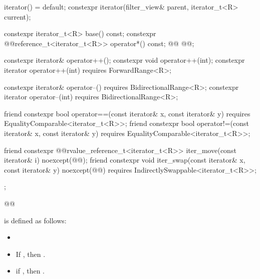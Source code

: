{\begin{codeblock}
{{    iterator() = default;
    constexpr iterator(filter_view& parent, iterator_t<R> current);

    constexpr iterator_t<R> base() const;
    constexpr @@reference_t<iterator_t<R>> operator*() const;
    @@
      @@;

    constexpr iterator& operator++();
    constexpr void operator++(int);
    constexpr iterator operator++(int) requires ForwardRange<R>;

    constexpr iterator& operator--() requires BidirectionalRange<R>;
    constexpr iterator operator--(int) requires BidirectionalRange<R>;

    friend constexpr bool operator==(const iterator& x, const iterator& y)
      requires EqualityComparable<iterator_t<R>>;
    friend constexpr bool operator!=(const iterator& x, const iterator& y)
      requires EqualityComparable<iterator_t<R>>;

    friend constexpr @@rvalue_reference_t<iterator_t<R>> iter_move(const iterator& i)
      noexcept(@\oldtxt{\seebelow}@);
    friend constexpr void iter_swap(const iterator& x, const iterator& y)
      noexcept(@\oldtxt{\seebelow}@)
      requires IndirectlySwappable<iterator_t<R>>;
  };
}@\oldtxt{\}}@
\end{codeblock}

\pnum
{}
is defined as follows:
\begin{itemize}
\item {}

\item If 
,
then   
.

\item {} if 
,
then   
.


\end{itemize}}
